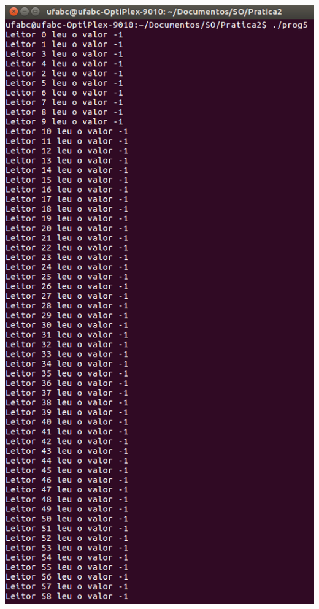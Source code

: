 \vspace{2em}
\begin{minipage}{\textwidth}
    \hspace{-1em}
    \centering
    \begin{minipage}[b]{0.49\textwidth}
        \centering
        \includegraphics[scale=.3]{pratica2/prog5.png}

\end{minipage}
\end{minipage}
